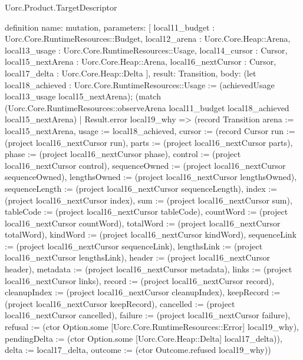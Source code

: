 \begin{lexlean}{Uorc.Product.TargetDescriptor}
\begin{semanticmodule}
definition{
  name: mutation,
  parameters: [
    local11_budget : Uorc.Core.RuntimeResources::Budget,
    local12_arena : Uorc.Core.Heap::Arena,
    local13_usage : Uorc.Core.RuntimeResources::Usage,
    local14_cursor : Cursor,
    local15_nextArena : Uorc.Core.Heap::Arena,
    local16_nextCursor : Cursor,
    local17_delta : Uorc.Core.Heap::Delta
  ],
  result: Transition,
  body: (let local18_achieved : Uorc.Core.RuntimeResources::Usage := (achievedUsage local13_usage local15_nextArena); (match (Uorc.Core.RuntimeResources::observeArena local11_budget local18_achieved local15_nextArena)
    | Result.error local19_why => (record Transition {arena := local15_nextArena, usage := local18_achieved, cursor := (record Cursor {run := (project local16_nextCursor run), parts := (project local16_nextCursor parts), phase := (project local16_nextCursor phase), control := (project local16_nextCursor control), sequenceOwned := (project local16_nextCursor sequenceOwned), lengthsOwned := (project local16_nextCursor lengthsOwned), sequenceLength := (project local16_nextCursor sequenceLength), index := (project local16_nextCursor index), sum := (project local16_nextCursor sum), tableCode := (project local16_nextCursor tableCode), countWord := (project local16_nextCursor countWord), totalWord := (project local16_nextCursor totalWord), kindWord := (project local16_nextCursor kindWord), sequenceLink := (project local16_nextCursor sequenceLink), lengthsLink := (project local16_nextCursor lengthsLink), header := (project local16_nextCursor header), metadata := (project local16_nextCursor metadata), links := (project local16_nextCursor links), record := (project local16_nextCursor record), cleanupIndex := (project local16_nextCursor cleanupIndex), keepRecord := (project local16_nextCursor keepRecord), cancelled := (project local16_nextCursor cancelled), failure := (project local16_nextCursor failure), refusal := (ctor Option.some [Uorc.Core.RuntimeResources::Error] local19_why), pendingDelta := (ctor Option.some [Uorc.Core.Heap::Delta] local17_delta)}), delta := local17_delta, outcome := (ctor Outcome.refused local19_why)})
}
\end{semanticmodule}
\end{lexlean}
